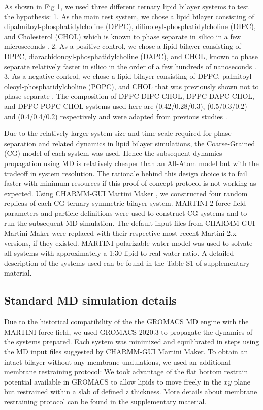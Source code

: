 \documentclass{biophys-new}
\begin{document}
As shown in Fig 1, we used three different ternary lipid bilayer systems to test the hypothesis:
1. As the main test system, we chose a lipid bilayer consisting of dipalmitoyl-phosphatidylcholine (DPPC), dilinoleyl-phosphatidylcholine
(DIPC), and Cholesterol (CHOL) which is known to phase separate in silico in a few microseconds \cite{Risselada2008,Schafer2010,Janosi2012,Doma2012,Jong2013,Liu2020,Su2020}.
2. As a positive control, we chose a lipid bilayer consisting of DPPC, diarachidonoyl-phosphatidylcholine (DAPC), and CHOL, known to phase separate relatively faster in silico in the order of a few hundreds of nanoseconds \cite{Lin2016,Lin2019,Davis2013a}.
3. As a negative control, we chose a lipid bilayer consisting of DPPC, palmitoyl-oleoyl-phosphatidylcholine (POPC), and CHOL that was previously shown not to
phase separate \cite{Veatch2003,Davis2013a}.
The composition of DPPC-DIPC-CHOL, DPPC-DAPC-CHOL, and DPPC-POPC-CHOL systems used here are (0.42/0.28/0.3),
(0.5/0.3/0.2) and (0.4/0.4/0.2) respectively and were adapted from previous studies \cite{Risselada2008,Lin2016,Davis2013a}.

Due to the relatively larger system size and time scale required for phase separation and related dynamics in lipid bilayer simulations, the Coarse-Grained (CG) model of 
each system was used.
Hence the subsequent dynamics propagation using MD is relatively cheaper than an All-Atom model but with the tradeoff in system resolution.
The rationale behind this design choice is to fail faster with minimum resources if this proof-of-concept protocol is not working as expected. 
Using CHARMM-GUI Martini Maker \cite{Qi2015}, we constructed four random replicas of each CG ternary symmetric bilayer system.
MARTINI 2 force field parameters and particle definitions\cite{Marrink2007,DeJong2013} were used to construct CG systems and to run the subsequent MD simulation. 
The default input files from CHARMM-GUI Martini Maker were replaced with their respective most recent Martini 2.x versions, if they existed.
MARTINI polarizable water model\cite{Yesylevskyy2010} was used to solvate all systems with approximately a 1:30 lipid to real water ratio.
A detailed description of the systems used can be found in the Table S1 of supplementary material.

\subsection*{Standard MD simulation details}

Due to the historical compatibility of the the GROMACS MD engine with the MARTINI force field, we used GROMACS 2020.3\cite{Abraham2015} to propagate the dynamics of the systems prepared. 
Each system was minimized and equilibrated in steps using the MD input files suggested by CHARMM-GUI Martini Maker.
To obtain an intact bilayer without any membrane undulations, we used an additional membrane restraining protocol: 
We took advantage of the flat bottom restrain potential available in GROMACS to allow lipids to move freely in the $xy$ plane but restrained within a slab of
defined z thickness.
More details about membrane restraining protocol can be found in the supplementary material.
\end{document}
